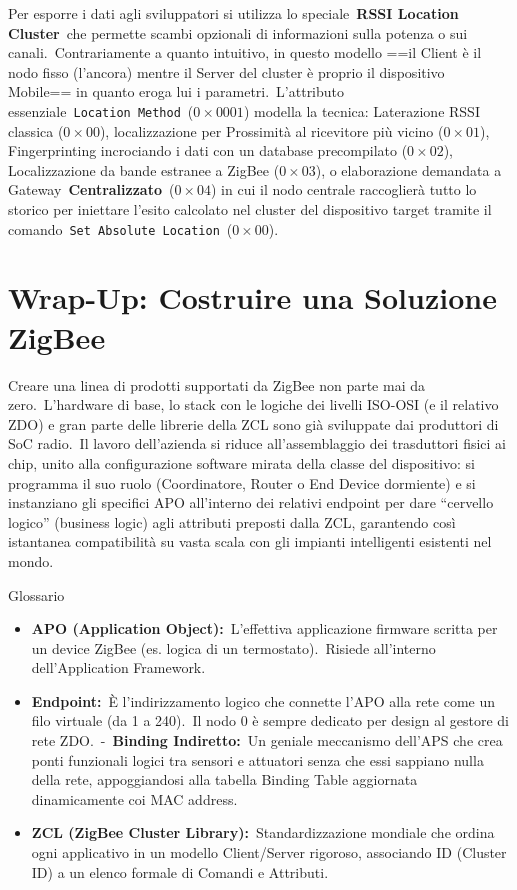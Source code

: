 \documentclass[
  italian,
  openany]{book}
\begin{document}
Per esporre i dati agli sviluppatori si utilizza lo
speciale~\textbf{RSSI Location Cluster}~che permette scambi opzionali di
informazioni sulla potenza o sui canali.~Contrariamente a quanto
intuitivo, in questo modello ==il Client è il nodo fisso (l'ancora)
mentre il Server del cluster è proprio il dispositivo Mobile== in quanto
eroga lui i parametri.~L'attributo
essenziale~\texttt{Location\ Method}~(\(0\times0001\)) modella la
tecnica: Laterazione RSSI classica (\(0\times00\)), localizzazione per
Prossimità al ricevitore più vicino (\(0\times01\)), Fingerprinting
incrociando i dati con un database precompilato (\(0\times02\)),
Localizzazione da bande estranee a ZigBee (\(0\times03\)), o
elaborazione demandata a Gateway~\textbf{Centralizzato}~(\(0\times04\))
in cui il nodo centrale raccoglierà tutto lo storico per iniettare
l'esito calcolato nel cluster del dispositivo target tramite il
comando~\texttt{Set\ Absolute\ Location}~(\(0\times00\)).

\section{Wrap-Up: Costruire una Soluzione
ZigBee}\label{wrap-up-costruire-una-soluzione-zigbee}

Creare una linea di prodotti supportati da ZigBee non parte mai da
zero.~L'hardware di base, lo stack con le logiche dei livelli ISO-OSI (e
il relativo ZDO) e gran parte delle librerie della ZCL sono già
sviluppate dai produttori di SoC radio.~Il lavoro dell'azienda si riduce
all'assemblaggio dei trasduttori fisici ai chip, unito alla
configurazione software mirata della classe del dispositivo: si
programma il suo ruolo (Coordinatore, Router o End Device dormiente) e
si instanziano gli specifici APO all'interno dei relativi endpoint per
dare ``cervello logico'' (business logic) agli attributi preposti dalla
ZCL, garantendo così istantanea compatibilità su vasta scala con gli
impianti intelligenti esistenti nel mondo.

\begin{calloutnote}{Glossario}

\begin{itemize}
\item
  \textbf{APO (Application Object):}~L'effettiva applicazione firmware
  scritta per un device ZigBee (es. logica di un termostato).~Risiede
  all'interno dell'Application Framework.
\item
  \textbf{Endpoint:}~È l'indirizzamento logico che connette l'APO alla
  rete come un filo virtuale (da 1 a 240).~Il nodo 0 è sempre dedicato
  per design al gestore di rete ZDO.~-~\textbf{Binding Indiretto:}~Un
  geniale meccanismo dell'APS che crea ponti funzionali logici tra
  sensori e attuatori senza che essi sappiano nulla della rete,
  appoggiandosi alla tabella Binding Table aggiornata dinamicamente coi
  MAC address.~
\item
  \textbf{ZCL (ZigBee Cluster Library):}~Standardizzazione mondiale che
  ordina ogni applicativo in un modello Client/Server rigoroso,
  associando ID (Cluster ID) a un elenco formale di Comandi e Attributi.
\end{itemize}

\end{calloutnote}
\end{document}
